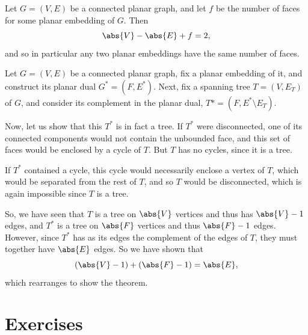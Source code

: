 \documentclass[nobib]{tufte-handout}
\begin{document}
\begin{theorem}
  Let $G = (V,E)$ be a connected planar graph, and let $f$ be the number of faces for some planar embedding of $G$. Then
  $$\abs{V} - \abs{E} + f = 2,$$
  and so in particular any two planar embeddings have the same number of faces.

  \begin{definition}
    Let $G = (V,E)$ be a connected planar graph, fix a planar embedding of it, and construct its planar dual $G^* = (F, E^*)$. Next, fix a spanning tree $T = (V, E_T)$ of $G$, and consider its complement in the planar dual, $T* = (F, E^* \setminus E_T)$.

    Now, let us show that this $T^*$ is in fact a tree. If $T^*$ were disconnected, one of its connected components would not contain the unbounded face, and this set of faces would be enclosed by a cycle of $T$. But $T$ has no cycles, since it is a tree.

    If $T^*$ contained a cycle, this cycle would necessarily enclose a vertex of $T$, which would be separated from the rest of $T$, and so $T$ would be disconnected, which is again impossible since $T$ is a tree.

    So, we have seen that $T$ is a tree on $\abs{V}$ vertices and thus has $\abs{V} - 1$ edges, and $T^*$ is a tree on $\abs{F}$ vertices and thus $\abs{F}-1$ edges. However, since $T^*$ has as its edges the complement of the edges of $T$, they must together have $\abs{E}$ edges. So we have shown that
    $$\left(\abs{V} - 1\right) + \left(\abs{F} - 1\right) = \abs{E},$$
    which rearranges to show the theorem.
  \end{definition}
\end{theorem}

\section{Exercises}


%
%
\end{document}
